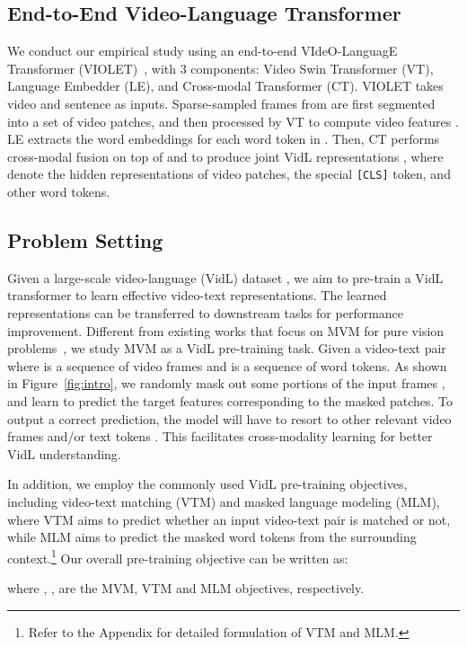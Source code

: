 \documentclass[10pt,twocolumn,letterpaper]{article}
\newcommand{\modelorig}{VIOLET\xspace}
\begin{document}
\subsection{End-to-End Video-Language Transformer} \label{sec:model_arch}
We conduct our empirical study using an end-to-end VIdeO-LanguagE Transformer (\modelorig)~\cite{fu2021violet}, with 3 components: Video Swin Transformer (VT), Language Embedder (LE), and Cross-modal Transformer (CT). \modelorig takes video  and sentence  as inputs. Sparse-sampled frames  from  are first segmented into a set of video patches, and then processed by VT to compute video features . LE extracts the word embeddings  for each word token  in . Then, CT performs cross-modal fusion on top of  and  to produce joint VidL representations , where  denote the hidden representations of video patches, the special \texttt{[CLS]} token, and other word tokens. 

\subsection{Problem Setting} \label{sec:prob_form}
Given a large-scale video-language (VidL) dataset , we aim to pre-train a VidL transformer to learn effective video-text representations. The learned representations can be transferred to downstream tasks for performance improvement. Different from existing works that focus on MVM for pure vision problems~\cite{bao2022beit,he2022mae,zhou2022ibot}, we study MVM as a VidL pre-training task. Given a video-text pair  where  is a sequence of video frames and  is a sequence of word tokens. As shown in Figure~\ref{fig:intro}, we randomly mask out some portions of the input frames , and learn to predict the target features corresponding to the masked patches. To output a correct prediction, the model will have to resort to other relevant video frames  and/or text tokens . This facilitates cross-modality learning for better VidL understanding.

In addition, we employ the commonly used VidL pre-training objectives, including video-text matching (VTM) and masked language modeling (MLM), where VTM aims to predict whether an input video-text pair is matched or not, while MLM aims to predict the masked word tokens from the surrounding context.\footnote{Refer to the Appendix for detailed formulation of VTM and MLM.} Our overall pre-training objective can be written as:

where , ,  are the MVM, VTM and MLM objectives, respectively. 
\end{document}
